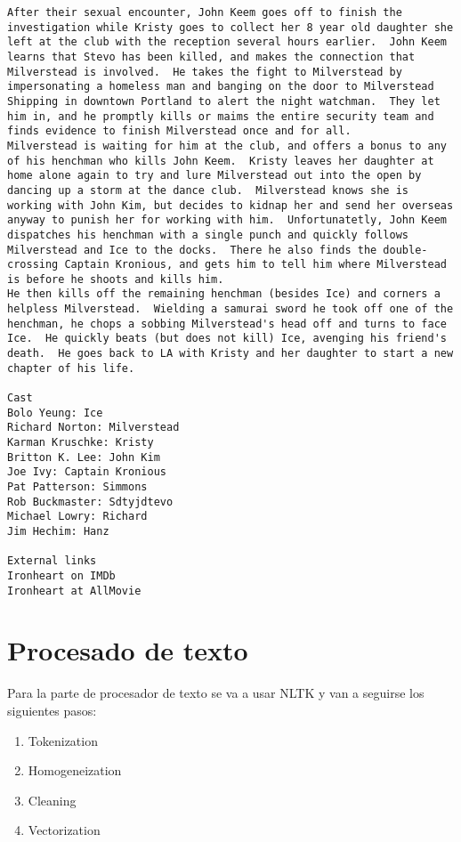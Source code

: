 \documentclass[11pt]{article}
\begin{document}
\begin{Verbatim}[commandchars=\\\{\}]
After their sexual encounter, John Keem goes off to finish the investigation while Kristy goes to collect her 8 year old daughter she left at the club with the reception several hours earlier.  John Keem learns that Stevo has been killed, and makes the connection that Milverstead is involved.  He takes the fight to Milverstead by impersonating a homeless man and banging on the door to Milverstead Shipping in downtown Portland to alert the night watchman.  They let him in, and he promptly kills or maims the entire security team and finds evidence to finish Milverstead once and for all.
Milverstead is waiting for him at the club, and offers a bonus to any of his henchman who kills John Keem.  Kristy leaves her daughter at home alone again to try and lure Milverstead out into the open by dancing up a storm at the dance club.  Milverstead knows she is working with John Kim, but decides to kidnap her and send her overseas anyway to punish her for working with him.  Unfortunatetly, John Keem dispatches his henchman with a single punch and quickly follows Milverstead and Ice to the docks.  There he also finds the double-crossing Captain Kronious, and gets him to tell him where Milverstead is before he shoots and kills him.
He then kills off the remaining henchman (besides Ice) and corners a helpless Milverstead.  Wielding a samurai sword he took off one of the henchman, he chops a sobbing Milverstead's head off and turns to face Ice.  He quickly beats (but does not kill) Ice, avenging his friend's death.  He goes back to LA with Kristy and her daughter to start a new chapter of his life.

Cast
Bolo Yeung: Ice
Richard Norton: Milverstead
Karman Kruschke: Kristy
Britton K. Lee: John Kim
Joe Ivy: Captain Kronious
Pat Patterson: Simmons
Rob Buckmaster: Sdtyjdtevo
Michael Lowry: Richard
Jim Hechim: Hanz

External links
Ironheart on IMDb 
Ironheart at AllMovie

    \end{Verbatim}

    \section{Procesado de texto}\label{procesado-de-texto}

Para la parte de procesador de texto se va a usar NLTK y van a seguirse
los siguientes pasos:

\begin{enumerate}
	\item Tokenization
	\item Homogeneization
	\item Cleaning
	\item Vectorization
\end{enumerate} 
\end{document}
